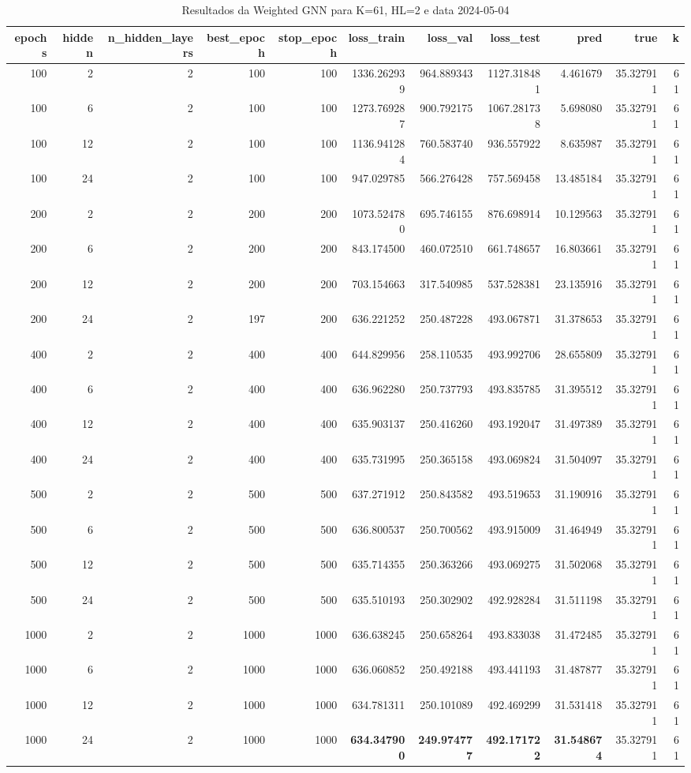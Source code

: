 \begin{table}
\caption{Resultados da Weighted GNN para K=61, HL=2 e data 2024-05-04}
\label{tab:weighted_gnn_results_k61_hl2_d20240504}
\begin{tabular}{rrrrrrrrrrr}
\toprule
epochs & hidden & n\_hidden\_layers & best\_epoch & stop\_epoch & loss\_train & loss\_val & loss\_test & pred & true & k \\
\midrule
100 & 2 & 2 & 100 & 100 & 1336.262939 & 964.889343 & 1127.318481 & 4.461679 & 35.327911 & 61 \\
100 & 6 & 2 & 100 & 100 & 1273.769287 & 900.792175 & 1067.281738 & 5.698080 & 35.327911 & 61 \\
100 & 12 & 2 & 100 & 100 & 1136.941284 & 760.583740 & 936.557922 & 8.635987 & 35.327911 & 61 \\
100 & 24 & 2 & 100 & 100 & 947.029785 & 566.276428 & 757.569458 & 13.485184 & 35.327911 & 61 \\
200 & 2 & 2 & 200 & 200 & 1073.524780 & 695.746155 & 876.698914 & 10.129563 & 35.327911 & 61 \\
200 & 6 & 2 & 200 & 200 & 843.174500 & 460.072510 & 661.748657 & 16.803661 & 35.327911 & 61 \\
200 & 12 & 2 & 200 & 200 & 703.154663 & 317.540985 & 537.528381 & 23.135916 & 35.327911 & 61 \\
200 & 24 & 2 & 197 & 200 & 636.221252 & 250.487228 & 493.067871 & 31.378653 & 35.327911 & 61 \\
400 & 2 & 2 & 400 & 400 & 644.829956 & 258.110535 & 493.992706 & 28.655809 & 35.327911 & 61 \\
400 & 6 & 2 & 400 & 400 & 636.962280 & 250.737793 & 493.835785 & 31.395512 & 35.327911 & 61 \\
400 & 12 & 2 & 400 & 400 & 635.903137 & 250.416260 & 493.192047 & 31.497389 & 35.327911 & 61 \\
400 & 24 & 2 & 400 & 400 & 635.731995 & 250.365158 & 493.069824 & 31.504097 & 35.327911 & 61 \\
500 & 2 & 2 & 500 & 500 & 637.271912 & 250.843582 & 493.519653 & 31.190916 & 35.327911 & 61 \\
500 & 6 & 2 & 500 & 500 & 636.800537 & 250.700562 & 493.915009 & 31.464949 & 35.327911 & 61 \\
500 & 12 & 2 & 500 & 500 & 635.714355 & 250.363266 & 493.069275 & 31.502068 & 35.327911 & 61 \\
500 & 24 & 2 & 500 & 500 & 635.510193 & 250.302902 & 492.928284 & 31.511198 & 35.327911 & 61 \\
1000 & 2 & 2 & 1000 & 1000 & 636.638245 & 250.658264 & 493.833038 & 31.472485 & 35.327911 & 61 \\
1000 & 6 & 2 & 1000 & 1000 & 636.060852 & 250.492188 & 493.441193 & 31.487877 & 35.327911 & 61 \\
1000 & 12 & 2 & 1000 & 1000 & 634.781311 & 250.101089 & 492.469299 & 31.531418 & 35.327911 & 61 \\
1000 & 24 & 2 & 1000 & 1000 & \textbf{634.347900} & \textbf{249.974777} & \textbf{492.171722} & \textbf{31.548674} & 35.327911 & 61 \\
\bottomrule
\end{tabular}
\end{table}

